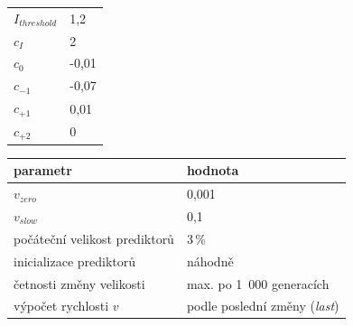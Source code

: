 \begin{table}[h]
{\begin{minipage}[t]{.28\textwidth}
\begin{tabular}{ll}
                \midrule
                $I_\mathit{threshold}$ & 1,2 \\
                $c_I$ & 2 \\
                $c_0$ & -0,01 \\
                $c_{-1}$ & -0,07 \\
                $c_{+1}$ & 0,01 \\
                $c_{+2}$ & 0 \\
                \bottomrule
            \end{tabular}
        \end{minipage}
        \hfill
        \begin{minipage}[t]{.7\textwidth}
            \centering\begin{tabular}{ll}
                \toprule
                parametr & hodnota \\
                \midrule
                $v_\mathit{zero}$ & 0,001 \\
                $v_\mathit{slow}$ & 0,1 \\
                počáteční velikost prediktorů & 3\,\% \\
                inicializace prediktorů & náhodně \\
                četnosti změny velikosti & max. po 1~000 generacích \\
                výpočet rychlosti $v$ & podle poslední změny (\emph{last}) \\
                \bottomrule
            \end{tabular}
        \end{minipage}
    }
\end{table}

